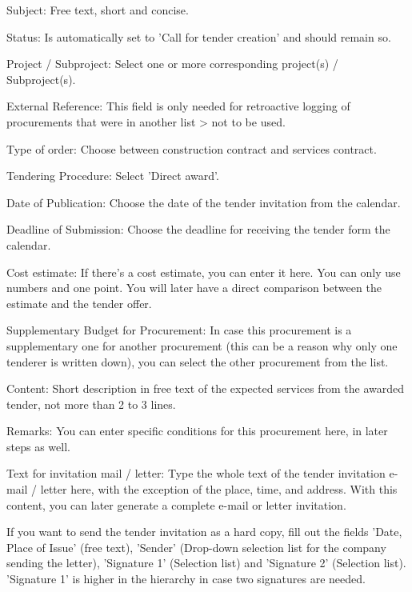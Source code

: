\begin{compactitem}
\item
Subject: Free text, short and concise.
\item
Status: Is automatically set to 'Call for tender creation' and should remain so.
\item
Project / Subproject: Select one or more corresponding project(s) / Subproject(s).
\item
External Reference: This field is only needed for retroactive logging of procurements that were in another list > not to be used.
\item
Type of order: Choose between construction contract and services contract.
\item
Tendering Procedure: Select 'Direct award'.
\item
Date of Publication: Choose the date of the tender invitation from the calendar.
\item
Deadline of Submission: Choose the deadline for receiving the tender form the calendar.
\item
Cost estimate: If there's a cost estimate, you can enter it here. You can only use numbers and one point. You will later have a direct comparison between the estimate and the tender offer.
\item
Supplementary Budget for Procurement: In case this procurement is a supplementary one for another procurement (this can be a reason why only one tenderer is written down), you can select the other procurement from the list.
\item
Content: Short description in free text of the expected services from the awarded tender, not more than 2 to 3 lines.
\item
Remarks: You can enter specific conditions for this procurement here, in later steps as well.
\item
Text for invitation mail / letter: Type the whole text of the tender invitation e-mail / letter here, with the exception of the place, time, and address. With this content, you can later generate a complete e-mail or letter invitation.
\item
If you want to send the tender invitation as a hard copy, fill out the fields 'Date, Place of Issue' (free text), 'Sender' (Drop-down selection list for the company sending the letter), 'Signature 1' (Selection list) and 'Signature 2' (Selection list). 'Signature 1' is higher in the hierarchy in case two signatures are needed.
\end{compactitem}

